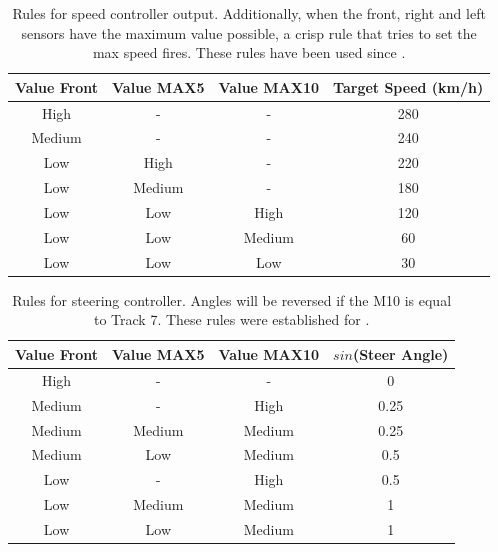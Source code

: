 \documentclass[10pt,journal,compsoc]{IEEEtran}
\begin{document}
%
\begin{table}[h!tb]
  \centering
  {\scriptsize
    \caption{Rules for speed controller output. Additionally, when
      the front, right and left sensors have the maximum value
      possible, a crisp rule that tries to set the max speed
      fires. These rules have been used since \cite{salem_evo18}. \label{tab:output:speed}}
    \begin{tabular}{|c|c|c||c|}
\hline
      Value Front & Value MAX5 & Value MAX10 & Target Speed (km/h) \\
      \hline
    	 High & - & - & 280 \\
      Medium & - & - & 240 \\
      Low & High & - & 220 \\
      Low & Medium & - & 180 \\
      Low & Low & High & 120 \\
      Low & Low & Medium & 60 \\           
      Low & Low & Low & 30 \\     
\hline
\hline
\end{tabular}
}
\end{table}
%
%
\begin{table}[h!tb]
  \centering
  {\scriptsize
    \caption{Rules for steering controller. Angles will be reversed
      if the M10 is equal to Track 7. These rules were established for \cite{salem_evo18}. \label{tab:output:steer}}
    \begin{tabular}{|c|c|c||c|}
\hline
      Value Front & Value MAX5 & Value MAX10 & $sin$(Steer Angle) \\
\hline
      High & - & - & 0 \\
      Medium & - & High & 0.25 \\
      Medium & Medium & Medium & 0.25 \\
      Medium & Low & Medium & 0.5 \\
      Low & - & High & 0.5 \\
      Low & Medium & Medium & 1 \\
      Low & Low & Medium & 1 \\ 
      
\hline
\end{tabular}
}
\end{table}
\end{document}
